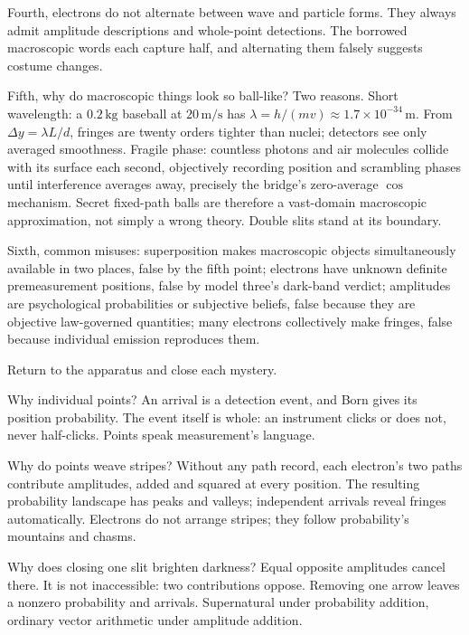 Fourth, electrons do not alternate between wave and particle forms. They always admit amplitude descriptions and whole-point detections. The borrowed macroscopic words each capture half, and alternating them falsely suggests costume changes.

Fifth, why do macroscopic things look so ball-like? Two reasons. Short wavelength: a \(0.2\,\mathrm{kg}\) baseball at \(20\,\mathrm{m/s}\) has \(\lambda = h/(mv) \approx 1.7\times10^{-34}\,\mathrm{m}\). From \(\Delta y = \lambda L/d\), fringes are twenty orders tighter than nuclei; detectors see only averaged smoothness. Fragile phase: countless photons and air molecules collide with its surface each second, objectively recording position and scrambling phases until interference averages away, precisely the bridge's zero-average \(\cos\) mechanism. Secret fixed-path balls are therefore a vast-domain macroscopic approximation, not simply a wrong theory. Double slits stand at its boundary.

Sixth, common misuses: superposition makes macroscopic objects simultaneously available in two places, false by the fifth point; electrons have unknown definite premeasurement positions, false by model three's dark-band verdict; amplitudes are psychological probabilities or subjective beliefs, false because they are objective law-governed quantities; many electrons collectively make fringes, false because individual emission reproduces them.


Return to the apparatus and close each mystery.

Why individual points? An arrival is a detection event, and Born gives its position probability. The event itself is whole: an instrument clicks or does not, never half-clicks. Points speak measurement's language.

Why do points weave stripes? Without any path record, each electron's two paths contribute amplitudes, added and squared at every position. The resulting probability landscape has peaks and valleys; independent arrivals reveal fringes automatically. Electrons do not arrange stripes; they follow probability's mountains and chasms.

Why does closing one slit brighten darkness? Equal opposite amplitudes cancel there. It is not inaccessible: two contributions oppose. Removing one arrow leaves a nonzero probability and arrivals. Supernatural under probability addition, ordinary vector arithmetic under amplitude addition.

